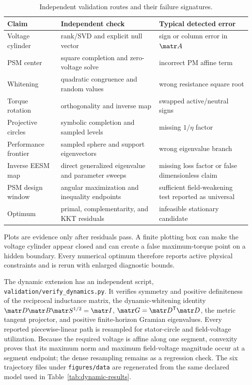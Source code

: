 \begin{table}[tb]
\centering
\caption{Independent validation routes and their failure signatures.}
\label{tab:validation}
\begin{tabularx}{\linewidth}{@{}p{.27\linewidth}X X@{}}
\toprule
Claim & Independent check & Typical detected error\\
\midrule
Voltage cylinder & rank/SVD and explicit null vector & sign or column error in \(\matr A\)\\
PSM center & square completion and zero-voltage solve & incorrect PM affine term\\
Whitening & quadratic congruence and random values & wrong resistance square root\\
Torque rotation & orthogonality and inverse map & swapped active/neutral signs\\
Projective circles & symbolic completion and sampled levels & missing \(1/\eta\) factor\\
Performance frontier & sampled sphere and support eigenvectors & wrong eigenvalue branch\\
Inverse EESM map & direct generalized eigenvalue and parameter sweeps & missing loss factor or false dimensionless claim\\
PSM design window & angular maximization and inequality endpoints & sufficient field-weakening test reported as universal\\
Optimum & primal, complementarity, and KKT residuals & infeasible stationary candidate\\
\bottomrule
\end{tabularx}
\end{table}

Plots are evidence only after residuals pass. A finite plotting box can make
the voltage cylinder appear closed and can create a false maximum-torque point
on a hidden boundary. Every numerical optimum therefore reports active
physical constraints and is rerun with enlarged diagnostic bounds.

The dynamic extension has an independent script,
\texttt{validation/verify\_dynamics.py}. It verifies symmetry and positive
definiteness of the reciprocal inductance matrix, the dynamic-whitening
identity \(\matr D\matr B\matr S^{1/2}=\matr I\),
\(\matr G=\matr D^{\mathsf T}\matr D\), the metric tangent projector, and
positive finite-horizon Gramian eigenvalues. Every reported piecewise-linear
path is resampled for stator-circle and field-voltage utilization. Because the
required voltage is affine along one segment, convexity proves that its
maximum norm and maximum field-voltage magnitude occur at a segment endpoint;
the dense resampling remains as a regression check. The six trajectory files
under \texttt{figures/data} are regenerated from the same declared model used
in Table~\ref{tab:dynamic-results}.
